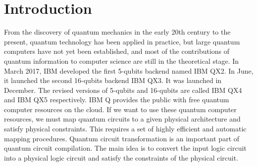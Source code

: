 \documentclass[runningheads]{llncs}
\begin{document}
\section{Introduction}
\label{Introduction}
From the discovery of quantum mechanics in the early 20th century to the present,
quantum technology has been applied in practice, but large quantum computers
have not yet been established, and most of the contributions of quantum 
information to computer science are still in the theoretical stage.
In March 2017, IBM developed the first 5-qubits backend named IBM QX2. 
In June, it launched the second 16-qubits backend IBM QX3.
It was launched in December. The revised versions of 5-qubits and 16-qubits 
are called IBM QX4 and IBM QX5 respectively.
IBM Q provides the public with free quantum computer resources on the cloud. 
If we want to use these quantum computer resources, 
we must map quantum circuits to a given physical architecture and 
satisfy physical constraints. This requires a set of highly efficient and 
automatic mapping procedures. Quantum circuit transformation is an important 
part of quantum circuit compilation. The main idea is to convert the input
logic circuit into a physical logic circuit and satisfy the constraints of
the physical circuit.
\end{document}
